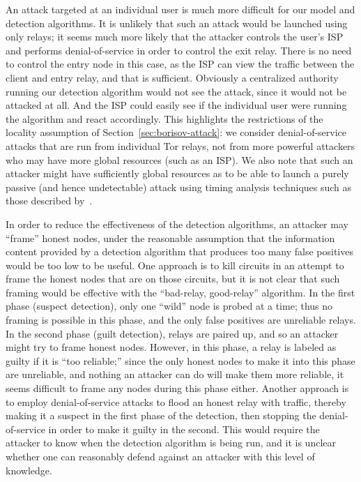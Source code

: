 \documentclass[]{lmcs}
\let\citeN\citet
\begin{document}
An attack targeted at an individual user is much more difficult
for our model and detection algorithms.  It is unlikely that such
an attack would be launched using only relays; it seems much more likely
that the attacker controls the user's ISP and performs denial-of-service
in order to control the exit relay.  There is no need to control the
entry node in this case, as the ISP can view the traffic between 
the client and entry relay, and that is sufficient.  Obviously a centralized
authority running our detection algorithm would not see the attack,
since it would not be attacked at all.  And the ISP could easily see
if the individual user were running the algorithm and react accordingly.
This highlights the restrictions of the locality assumption of
Section~\ref{sec:borisov-attack}:  we consider denial-of-service attacks
that are run from individual Tor relays, not from more powerful attackers
who may have more global resources (such as an ISP).  We also note that
such an attacker might have sufficiently global resources as to be
able to launch a purely passive (and hence undetectable) attack using
timing analysis techniques such as those described
by~\citeN{murdoch-zielinski:pet2007}.

In order to reduce the effectiveness of the detection algorithms,
an attacker may ``frame'' honest nodes, under the reasonable assumption
that the information content provided by 
a detection algorithm that produces too many false positives
would be too low to be useful.  
One approach is to kill circuits in an attempt to frame the honest
nodes that are on those circuits, but
it is not clear that such framing
would be effective with the ``bad-relay, good-relay'' algorithm.
In the first phase (suspect detection), only one ``wild'' node is probed
at a time; thus no framing is possible in this phase, and the only
false positives are unreliable relays.  In the second phase (guilt detection),
relays are paired up, and so an attacker might try to frame honest nodes.
However, in this phase, a relay is labeled as guilty if it is
``too reliable;'' since the only honest nodes to make it into this phase
are unreliable, and nothing an attacker can do will make them more
reliable, it seems difficult to frame any nodes during this phase either.
Another approach is to employ denial-of-service attacks to flood
an honest relay with traffic, thereby making it a suspect in the first
phase of the detection, then stopping the denial-of-service in order
to make it guilty in the second.  This would require the attacker to
know when the detection algorithm is being run, and it is unclear
whether one can reasonably defend against an attacker with this level
of knowledge.
\end{document}

